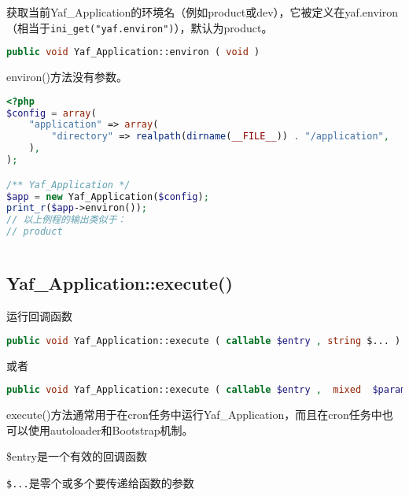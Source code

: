 获取当前Yaf\_Application的环境名（例如product或dev），它被定义在yaf.environ（相当于\texttt{ini\_get("yaf.environ")}），默认为product。






\begin{lstlisting}[language=PHP]
public void Yaf_Application::environ ( void )
\end{lstlisting}

environ()方法没有参数。

\begin{lstlisting}[language=PHP]
<?php
$config = array(
    "application" => array(
        "directory" => realpath(dirname(__FILE__)) . "/application",
    ),
);

/** Yaf_Application */
$app = new Yaf_Application($config);
print_r($app->environ());
// 以上例程的输出类似于：
// product
\end{lstlisting}



\begin{lstlisting}[language=PHP]

\end{lstlisting}


\subsection{Yaf\_Application::execute()}

运行回调函数






\begin{lstlisting}[language=PHP]
public void Yaf_Application::execute ( callable $entry , string $... )
\end{lstlisting}

或者

\begin{lstlisting}[language=PHP]
public void Yaf_Application::execute ( callable $entry ,  mixed  $parameter = NULL,$parameter  $... = NULL )
\end{lstlisting}


execute()方法通常用于在cron任务中运行Yaf\_Application，而且在cron任务中也可以使用autoloader和Bootstrap机制。

\begin{compactitem}
\item \$entry是一个有效的回调函数
\item \texttt{\$...}是零个或多个要传递给函数的参数
\end{compactitem}



